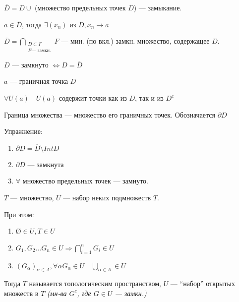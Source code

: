 




 
\noindent
$\overline D=D\cup $ (множество предельных точек $D$) --- замыкание.

\begin{remark}
$a\in\overline D$, тогда $\exists (x_n)$ из $D, x_n\to a$
\end{remark}

\begin{remark}
$\overline D = \bigcap\limits_{\substack{D\subset F \\ F \text{--- замкн.}}} F$ --- мин. (по вкл.) замкн. множество, содержащее $D$.
\end{remark}

\begin{remark}
$D$ --- замкнуто $\Leftrightarrow D=\overline D$
\end{remark}

\begin{definition}
$a$ --- граничная точка $D$

$\forall U(a) \quad U(a)$ содержит точки как из $D$, так и из $D^c$
\end{definition}

\begin{definition}
Граница множества --- множество его граничных точек. Обозначается $\partial D$
\end{definition}

Упражнение:
\begin{enumerate}
    \item $\partial D=\overline D \setminus IntD$
    \item $\partial D$ --- замкнута
    \item $\forall$ множество предельных точек --- замнуто.
\end{enumerate}

\begin{definition}
$T$ --- множество, $U$ --- набор неких подмножеств $T$.

При этом: \begin{enumerate}
    \item \O$\in U, T\in U$
    \item $G_1,G_2\ldots G_n\in U \Rightarrow \bigcap\limits_{i=1}^n G_i\in U$
    \item $(G_\alpha)_{\alpha\in A}, \forall \alpha G_\alpha\in U \quad \bigcup\limits_{\alpha\in A}\in U$
\end{enumerate}
Тогда $T$ называется топологическим пространством, $U$ --- ``набор'' открытых множеств в $T$ \textit{(мн-ва $G^c$, где $G\in U$ --- замкн.)}
\end{definition}

